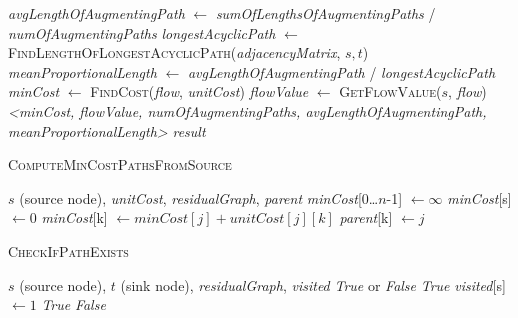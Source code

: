 \documentclass{article}
\begin{document}
\begin{algorithm}[H]
\begin{algorithmic}[1]
\State \textit{avgLengthOfAugmentingPath} $\gets$ \textit{sumOfLengthsOfAugmentingPaths} / \textit{numOfAugmentingPaths}
\State \textit{longestAcyclicPath} $\gets$ \textcolor{identifiercolor}{\textsc{FindLengthOfLongestAcyclicPath}}(\textit{adjacencyMatrix}, $s, t$)
\State \textit{meanProportionalLength} $\gets$ \textit{avgLengthOfAugmentingPath} / \textit{longestAcyclicPath}
\State \textit{minCost} $\gets$ \textcolor{identifiercolor}{\textsc{FindCost}}(\textit{flow}, \textit{unitCost})
\State \textit{flowValue} $\gets$ \textcolor{identifiercolor}{\textsc{GetFlowValue}}($s$, \textit{flow})
\State {} \textit{<minCost, flowValue, numOfAugmentingPaths, avgLengthOfAugmentingPath, meanProportionalLength>}
\State \Return \textit{result}
\end{algorithmic}
\end{algorithm}



\begin{algorithm}[H]
\caption{\textcolor{keywordcolor}{\textsc{ComputeMinCostPathsFromSource}}}
\begin{algorithmic}[1]
\State {} $s$ (source node), \textit{unitCost}, \textit{residualGraph}, \textit{parent}
\State {} \textit{minCost}[0…$n$-1] $\gets \infty$
\State \textit{minCost}[s] $\gets 0$
                        \State \textit{minCost}[k] $\gets \textit{minCost}[j] + \textit{unitCost}[j][k]$
                        \State \textit{parent}[k] $\gets j$
                    \EndIf
                \EndIf
            \EndIf
        \EndFor
    \EndFor
\EndFor
\end{algorithmic}
\end{algorithm}

\begin{algorithm}[H]
\caption{\textcolor{keywordcolor}{\textsc{CheckIfPathExists}}}
\begin{algorithmic}[1]
\State {} $s$ (source node), $t$ (sink node), \textit{residualGraph}, \textit{visited}
\State {} \textit{True} or \textit{False}
    \State \Return \textit{True}
\EndIf
\State \textit{visited}[s] $\gets 1$
            \State \Return \textit{True}
        \EndIf
    \EndIf
\EndFor
\State \Return \textit{False}
\end{algorithmic}
\end{algorithm}
\end{document}
